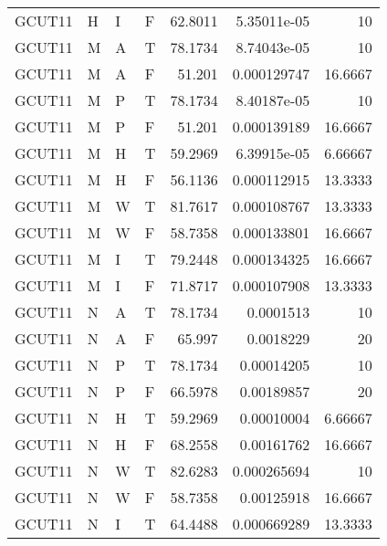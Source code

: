 \begin{longtable}{llllrrr}
    GCUT11   & H         & I         & F          & 62.8011    & 5.35011e-05 & 10       \\
    GCUT11   & M         & A         & T          & 78.1734    & 8.74043e-05 & 10       \\
    GCUT11   & M         & A         & F          & 51.201     & 0.000129747 & 16.6667  \\
    GCUT11   & M         & P         & T          & 78.1734    & 8.40187e-05 & 10       \\
    GCUT11   & M         & P         & F          & 51.201     & 0.000139189 & 16.6667  \\
    GCUT11   & M         & H         & T          & 59.2969    & 6.39915e-05 & 6.66667  \\
    GCUT11   & M         & H         & F          & 56.1136    & 0.000112915 & 13.3333  \\
    GCUT11   & M         & W         & T          & 81.7617    & 0.000108767 & 13.3333  \\
    GCUT11   & M         & W         & F          & 58.7358    & 0.000133801 & 16.6667  \\
    GCUT11   & M         & I         & T          & 79.2448    & 0.000134325 & 16.6667  \\
    GCUT11   & M         & I         & F          & 71.8717    & 0.000107908 & 13.3333  \\
    GCUT11   & N         & A         & T          & 78.1734    & 0.0001513   & 10       \\
    GCUT11   & N         & A         & F          & 65.997     & 0.0018229   & 20       \\
    GCUT11   & N         & P         & T          & 78.1734    & 0.00014205  & 10       \\
    GCUT11   & N         & P         & F          & 66.5978    & 0.00189857  & 20       \\
    GCUT11   & N         & H         & T          & 59.2969    & 0.00010004  & 6.66667  \\
    GCUT11   & N         & H         & F          & 68.2558    & 0.00161762  & 16.6667  \\
    GCUT11   & N         & W         & T          & 82.6283    & 0.000265694 & 10       \\
    GCUT11   & N         & W         & F          & 58.7358    & 0.00125918  & 16.6667  \\
    GCUT11   & N         & I         & T          & 64.4488    & 0.000669289 & 13.3333  \\

\end{longtable}
